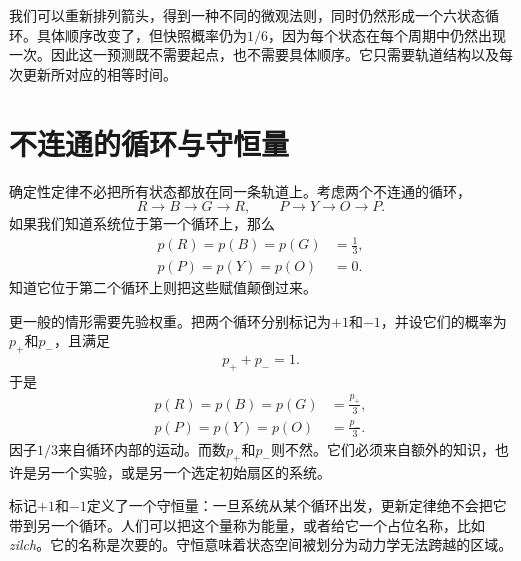 我们可以重新排列箭头，得到一种不同的微观法则，同时仍然形成一个六状态循环。具体顺序改变了，但快照概率仍为\(1/6\)，因为每个状态在每个周期中仍然出现一次。因此这一预测既不需要起点，也不需要具体顺序。它只需要轨道结构以及每次更新所对应的相等时间。

\begin{classroomqa}
\end{classroomqa}

\section{不连通的循环与守恒量}

确定性定律不必把所有状态都放在同一条轨道上。考虑两个不连通的循环，
\begin{equation}
 R\longrightarrow B\longrightarrow G\longrightarrow R,
 \qquad
 P\longrightarrow Y\longrightarrow O\longrightarrow P.
 \label{eq:sm1-two-cycles}
\end{equation}
如果我们知道系统位于第一个循环上，那么
\begin{equation}
 \begin{aligned}
 p(R)=p(B)=p(G)&=\frac13,\\
 p(P)=p(Y)=p(O)&=0.
 \end{aligned}
\end{equation}
知道它位于第二个循环上则把这些赋值颠倒过来。

更一般的情形需要先验权重。把两个循环分别标记为\(+1\)和\(-1\)，并设它们的概率为\(p_+\)和\(p_-\)，且满足
\begin{equation}
 p_++p_-=1.
\end{equation}
于是
\begin{align}
 p(R)=p(B)=p(G)&=\frac{p_+}{3},\\
 p(P)=p(Y)=p(O)&=\frac{p_-}{3}.
 \label{eq:sm1-sector-weights}
\end{align}
因子\(1/3\)来自循环内部的运动。而数\(p_+\)和\(p_-\)则不然。它们必须来自额外的知识，也许是另一个实验，或是另一个选定初始扇区的系统。

标记\(+1\)和\(-1\)定义了一个守恒量：一旦系统从某个循环出发，更新定律绝不会把它带到另一个循环。人们可以把这个量称为能量，或者给它一个占位名称，比如\emph{zilch}。它的名称是次要的。守恒意味着状态空间被划分为动力学无法跨越的区域。

